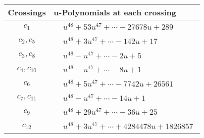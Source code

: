 \documentclass[1p]{elsarticle_modified}
\theoremstyle{definition}
\begin{document}
\begin{tabular}{m{50pt}|m{274pt}}
Crossings & \hspace{64pt}u-Polynomials at each crossing \\
\hline $$\begin{aligned}c_{1}\end{aligned}$$&$\begin{aligned}
&u^{48}+53 u^{47}+\cdots-27678 u+289
\end{aligned}$\\
\hline $$\begin{aligned}c_{2},c_{5}\end{aligned}$$&$\begin{aligned}
&u^{48}+3 u^{47}+\cdots-142 u+17
\end{aligned}$\\
\hline $$\begin{aligned}c_{3},c_{8}\end{aligned}$$&$\begin{aligned}
&u^{48}- u^{47}+\cdots-2 u+5
\end{aligned}$\\
\hline $$\begin{aligned}c_{4},c_{10}\end{aligned}$$&$\begin{aligned}
&u^{48}- u^{47}+\cdots-8 u+1
\end{aligned}$\\
\hline $$\begin{aligned}c_{6}\end{aligned}$$&$\begin{aligned}
&u^{48}+5 u^{47}+\cdots-7742 u+26561
\end{aligned}$\\
\hline $$\begin{aligned}c_{7},c_{11}\end{aligned}$$&$\begin{aligned}
&u^{48}- u^{47}+\cdots-14 u+1
\end{aligned}$\\
\hline $$\begin{aligned}c_{9}\end{aligned}$$&$\begin{aligned}
&u^{48}+29 u^{47}+\cdots-36 u+25
\end{aligned}$\\
\hline $$\begin{aligned}c_{12}\end{aligned}$$&$\begin{aligned}
&u^{48}+3 u^{47}+\cdots+4284478 u+1826857
\end{aligned}$\\
\hline
\end{tabular}\\~\\
\end{document}
